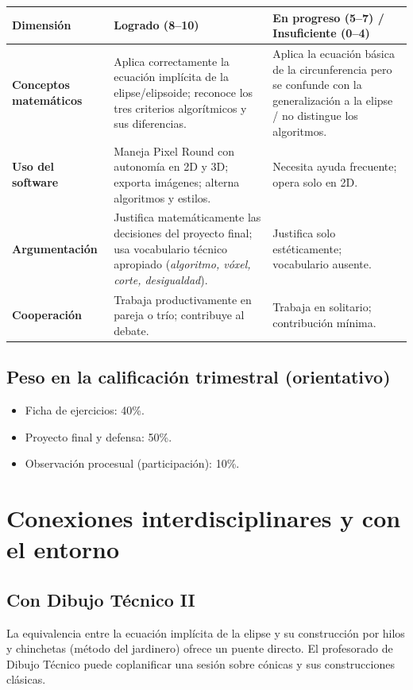 \documentclass[12pt,a4paper]{scrartcl}
\begin{document}
\begin{center}
\small
\begin{tabularx}{\textwidth}{@{}p{}XX@{}}
\toprule
\textbf{Dimensión} & \textbf{Logrado (8--10)} & \textbf{En progreso (5--7) / Insuficiente (0--4)} \\
\midrule
\textbf{Conceptos matemáticos} & Aplica correctamente la ecuación implícita de la elipse/elipsoide; reconoce los tres criterios algorítmicos y sus diferencias. & Aplica la ecuación básica de la circunferencia pero se confunde con la generalización a la elipse / no distingue los algoritmos. \\
\addlinespace[3pt]
\textbf{Uso del software} & Maneja Pixel Round con autonomía en 2D y 3D; exporta imágenes; alterna algoritmos y estilos. & Necesita ayuda frecuente; opera solo en 2D. \\
\addlinespace[3pt]
\textbf{Argumentación} & Justifica matemáticamente las decisiones del proyecto final; usa vocabulario técnico apropiado (\emph{algoritmo, vóxel, corte, desigualdad}). & Justifica solo estéticamente; vocabulario ausente. \\
\addlinespace[3pt]
\textbf{Cooperación} & Trabaja productivamente en pareja o trío; contribuye al debate. & Trabaja en solitario; contribución mínima. \\
\bottomrule
\end{tabularx}
\end{center}

\subsection{Peso en la calificación trimestral (orientativo)}
\begin{itemize}[leftmargin=1.3em,itemsep=0.1em,topsep=0.2em,nosep]
  \item Ficha de ejercicios: 40\%.
  \item Proyecto final y defensa: 50\%.
  \item Observación procesual (participación): 10\%.
\end{itemize}

\section{Conexiones interdisciplinares y con el entorno}

\subsection{Con Dibujo Técnico II}
La equivalencia entre la ecuación implícita de la elipse y su construcción por hilos y chinchetas (método del jardinero) ofrece un puente directo. El profesorado de Dibujo Técnico puede coplanificar una sesión sobre cónicas y sus construcciones clásicas.
\end{document}
